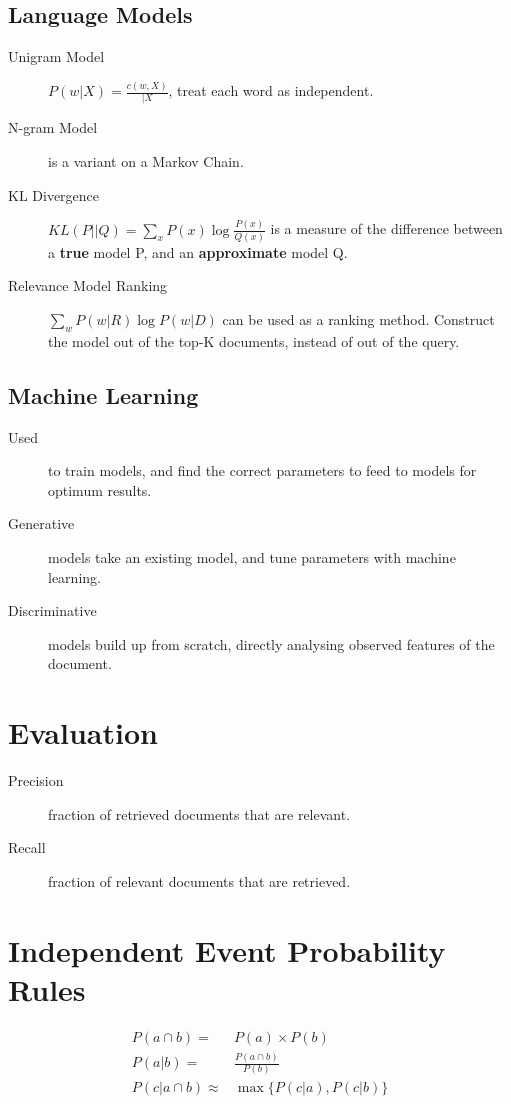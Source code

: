 \documentclass[landscape]{cheat}
\begin{document}
\begin{multicols*}{3}
\subsection{Language Models}
\begin{description}
    \item[Unigram Model] $P(w|X) = \frac {c(w, X)} {|X}$, treat each word as independent.
    \item[N-gram Model] is a variant on a Markov Chain.
    \item[KL Divergence] $KL(P||Q) = \sum_x {P(x) \log \frac {P(x)} {Q(x)}}$ is a measure of the difference between a \textbf{true} model P, and an \textbf{approximate} model Q.
    \item[Relevance Model Ranking] $\sum_w {P(w|R) \log {P(w|D)}}$ can be used as a ranking method.
        Construct the model out of the top-K documents, instead of out of the query.
\end{description}

\subsection{Machine Learning}
\begin{description}
    \item[Used] to train models, and find the correct parameters to feed to models for optimum results.
    \item[Generative] models take an existing model, and tune parameters with machine learning.
    \item[Discriminative] models build up from scratch, directly analysing observed features of the document.
\end{description}

\section{Evaluation}
\begin{description}
    \item[Precision] fraction of retrieved documents that are relevant.
    \item[Recall] fraction of relevant documents that are retrieved.
\end{description}

\section{Independent Event Probability Rules}
\begin{align*}
    P(a \cap b) =& P(a) \times P(b) \\
    P(a | b) =& \frac{P(a \cap b)}{P(b)} \\
    P(c | a \cap b) \approx& \max{\{ P(c | a), P(c | b) \}}
\end{align*}

\end{multicols*}
\end{document}
